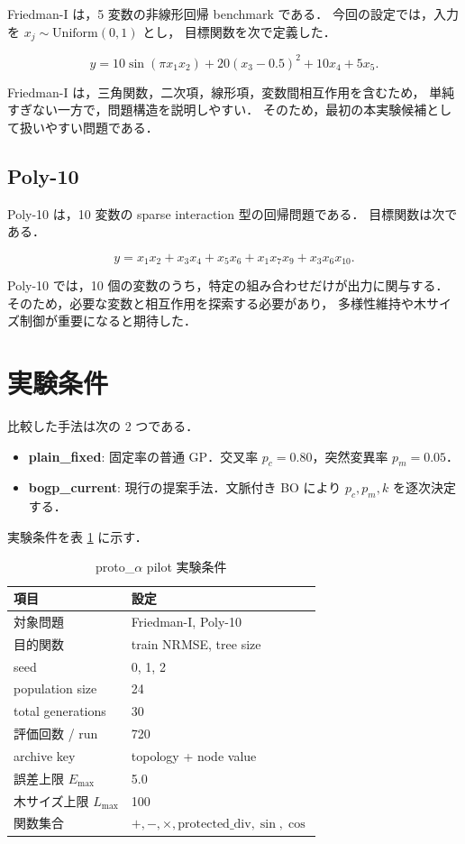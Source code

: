\documentclass[a4paper,11pt]{ltjsarticle}
\begin{document}
Friedman-I は，5 変数の非線形回帰 benchmark である．
今回の設定では，入力を \(x_j \sim \mathrm{Uniform}(0,1)\) とし，
目標関数を次で定義した．

\[
y =
10\sin(\pi x_1 x_2)
+20(x_3-0.5)^2
+10x_4
+5x_5.
\]

Friedman-I は，三角関数，二次項，線形項，変数間相互作用を含むため，
単純すぎない一方で，問題構造を説明しやすい．
そのため，最初の本実験候補として扱いやすい問題である．

\subsection{Poly-10}

Poly-10 は，10 変数の sparse interaction 型の回帰問題である．
目標関数は次である．

\[
y =
x_1x_2
+x_3x_4
+x_5x_6
+x_1x_7x_9
+x_3x_6x_{10}.
\]

Poly-10 では，10 個の変数のうち，特定の組み合わせだけが出力に関与する．
そのため，必要な変数と相互作用を探索する必要があり，
多様性維持や木サイズ制御が重要になると期待した．

\section{実験条件}

比較した手法は次の 2 つである．

\begin{itemize}
  \item \textbf{plain\_fixed}: 固定率の普通 GP．交叉率 \(p_c=0.80\)，突然変異率 \(p_m=0.05\)．
  \item \textbf{bogp\_current}: 現行の提案手法．文脈付き BO により \(p_c,p_m,k\) を逐次決定する．
\end{itemize}

実験条件を表 \ref{tab:conditions} に示す．

\begin{table}[htbp]
\centering
\caption{proto\_\(\alpha\) pilot 実験条件}
\label{tab:conditions}
\begin{tabular}{ll}
\toprule
項目 & 設定 \\
\midrule
対象問題 & Friedman-I, Poly-10 \\
目的関数 & train NRMSE, tree size \\
seed & 0, 1, 2 \\
population size & 24 \\
total generations & 30 \\
評価回数 / run & 720 \\
archive key & topology + node value \\
誤差上限 \(E_{\max}\) & 5.0 \\
木サイズ上限 \(L_{\max}\) & 100 \\
関数集合 & \(+, -, \times, \mathrm{protected\_div}, \sin, \cos\) \\
\bottomrule
\end{tabular}
\end{table}
\end{document}
